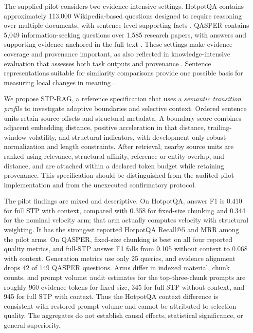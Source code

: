\documentclass[10pt]{article}
\begin{document}
The supplied pilot considers two evidence-intensive settings. HotpotQA contains approximately 113,000 Wikipedia-based questions designed to require reasoning over multiple documents, with sentence-level supporting facts \cite{Yang2018HotpotqaDataset}. QASPER contains 5,049 information-seeking questions over 1,585 research papers, with answers and supporting evidence anchored in the full text \cite{Dasigi2021DatasetInformationseeking}. These settings make evidence coverage and provenance important, as also reflected in knowledge-intensive evaluation that assesses both task outputs and provenance \cite{Petroni2020KiltBenchmark}. Sentence representations suitable for similarity comparisons provide one possible basis for measuring local changes in meaning \cite{Reimers2019SentencebertSentence}.

We propose STP-RAG, a reference specification that uses a \emph{semantic transition profile} to investigate adaptive boundaries and selective context. Ordered sentence units retain source offsets and structural metadata. A boundary score combines adjacent embedding distance, positive acceleration in that distance, trailing-window volatility, and structural indicators, with development-only robust normalization and length constraints. After retrieval, nearby source units are ranked using relevance, structural affinity, reference or entity overlap, and distance, and are attached within a declared token budget while retaining provenance. This specification should be distinguished from the audited pilot implementation and from the unexecuted confirmatory protocol.

The pilot findings are mixed and descriptive. On HotpotQA, answer F1 is 0.410 for full STP with context, compared with 0.358 for fixed-size chunking and 0.344 for the nominal velocity arm; that arm actually computes velocity with structural weighting. It has the strongest reported HotpotQA Recall@5 and MRR among the pilot arms. On QASPER, fixed-size chunking is best on all four reported quality metrics, and full-STP answer F1 falls from 0.105 without context to 0.068 with context. Generation metrics use only 25 queries, and evidence alignment drops 42 of 149 QASPER questions. Arms differ in indexed material, chunk counts, and prompt volume: audit estimates for the top-three-chunk prompts are roughly 960 evidence tokens for fixed-size, 345 for full STP without context, and 945 for full STP with context. Thus the HotpotQA context difference is consistent with restored prompt volume and cannot be attributed to selection quality. The aggregates do not establish causal effects, statistical significance, or general superiority.
\end{document}
